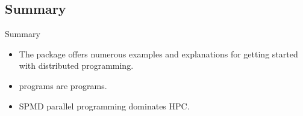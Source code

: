 \subsection{Summary}

\begin{frame}
  \begin{block}{Summary}
    \begin{itemize}
    \item The  package offers numerous examples and explanations
      for getting started with distributed \R programming.
    \item \pbdR programs are \R programs.
    \item SPMD parallel programming dominates HPC.
    \end{itemize}
  \end{block}
\end{frame}